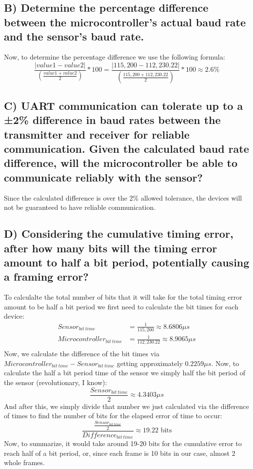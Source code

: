 \documentclass{article}
\begin{document}
\pagebreak
\subsection{B) Determine the percentage difference between the microcontroller’s actual baud rate and the sensor’s baud rate.}
Now, to determine the percentage difference we use the following formula:
$$ \frac{|value1 - value2|}{(\frac{value1 + value2}{2})}*100 = \frac{|115,200-112,230.22|}{(\frac{115,200+112,230.22}{2})}*100 \approx 2.6\% $$

\subsection{C) UART communication can tolerate up to a ±2\% difference in baud rates between the transmitter and receiver for reliable communication. Given the calculated baud rate difference, will the microcontroller be able to communicate reliably with the sensor?}
Since the calculated difference is over the 2\% allowed tolerance, the devices will not be guaranteed to have reliable communication.

\subsection{D) Considering the cumulative timing error, after how many bits will the timing error amount to half a bit period, potentially causing a framing error?}
To calculalte the total number of bits that it will take for the total timing error amount to be half a bit period we first need to calculate the bit times for each device:
\begin{align*}
Sensor_{bit\ time} &= \frac{1}{115,200} \approx 8.6806\mu s \\
Microcontroller_{bit\ time} &= \frac{1}{112,230.22} \approx 8.9065\mu s \\
\end{align*}
Now, we calculate the difference of the bit times via $Microcontroller_{bit\ time} - Sensor_{bit\ time}$ getting approximately $0.2259\mu s$. Now, to calculate the half a bit period time of the sensor we simply half the bit period of the sensor (revolutionary, I know):
$$ \frac{Sensor_{bit\ time}}{2} \approx 4.3403\mu s$$
And after this, we simply divide that number we just calculated via the difference of times to find the number of bits for the elapsed error of time to occur:
$$ \frac{\frac{Sensor_{bit\ time}}{2}}{Difference_{bit\ time}} \approx 19.22\text{ bits}$$
Now, to summarize, it would take around 19-20 bits for the cumulative error to reach half of a bit period, or, since each frame is 10 bits in our case, almost 2 whole frames.
\end{document}
